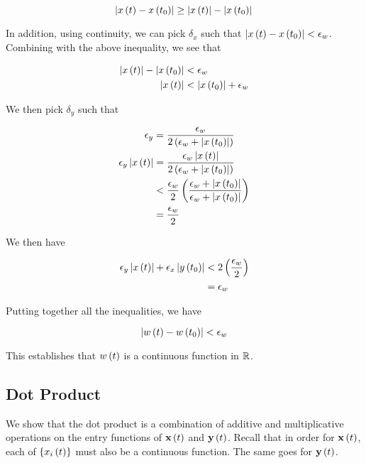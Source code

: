 \documentclass{article}
\begin{document}
$$
  \left\lvert x \left ( t \right) - x \left ( t_0 \right) \right\rvert \geq \left\lvert x \left ( t \right) \right\rvert - \left\lvert x \left ( t_0 \right) \right\rvert \\
$$

In addition, using continuity, we can pick $\delta_x$ such that $\left\lvert x \left ( t \right) - x \left ( t_0 \right) \right\rvert < \epsilon_w$.
Combining with the above inequality, we see that

\begin{align*}
  \left\lvert x \left ( t \right) \right\rvert - \left\lvert x \left ( t_0 \right) \right\rvert &< \epsilon_w \\
  \left\lvert x \left ( t \right) \right\rvert &< \left\lvert x \left ( t_0 \right) \right\rvert + \epsilon_w \\
\end{align*}

We then pick $\delta_y$ such that

\begin{align*}
  \epsilon_y &= \frac{\epsilon_w}{2 \left ( \epsilon_w + \left\lvert x \left ( t_0 \right) \right\rvert \right)} \\
  \epsilon_y \left\lvert x \left ( t \right) \right\rvert &= \frac{\epsilon_w \left\lvert x \left ( t \right) \right\rvert}{2 \left ( \epsilon_w + \left\lvert x \left ( t_0 \right) \right\rvert \right)} \\
             & < \frac{\epsilon_w}{2} \left ( \frac{\epsilon_w + \left\lvert x \left ( t_0 \right) \right\rvert}{\epsilon_w + \left\lvert x \left ( t_0 \right) \right\rvert} \right) \\
             &= \frac{\epsilon_w}{2} \\
\end{align*}

We then have

\begin{align*}
  \epsilon_y \left\lvert x \left ( t \right) \right\rvert + \epsilon_x \left\lvert y \left ( t_0 \right) \right\rvert & < 2 \left ( \frac{\epsilon_w}{2} \right) \\
  &= \epsilon_w
\end{align*}

Putting together all the inequalities, we have

$$
\left\lvert w \left ( t \right) - w \left ( t_0 \right) \right\rvert < \epsilon_w
$$

This establishes that $w \left ( t \right)$ is a continuous function in $\mathbb R$.


\subsection*{Dot Product}
We show that the dot product is a combination of additive and multiplicative operations on the entry functions of $\textbf{x} \left ( t \right)$ and $\textbf{y} \left ( t \right)$.
Recall that in order for $\textbf{x} \left ( t \right)$, each of $\left \{ x_i \left ( t \right) \right \}$ must also be a continuous function.
The same goes for $\textbf{y} \left ( t \right)$.
\end{document}
